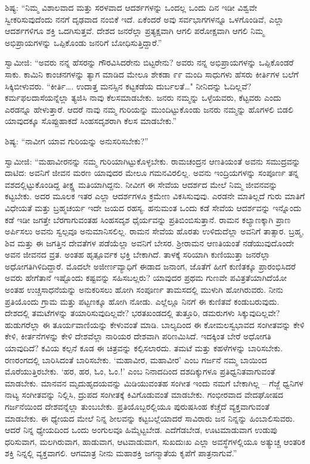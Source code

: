  ಶಿಷ್ಯ: “ನಿಮ್ಮ ವಿಶಾಲವಾದ ಮತ್ತು ಸರಳವಾದ ಆದರ್ಶಗಳನ್ನು ಒಂದಲ್ಲ ಒಂದು ದಿನ ಇಡೀ ವಿಶ್ವವೇ ಸ್ವೀಕರಿಸುವುದೆಂದು ನನಗೆ ದೃಢವಾದ ನಂಬಿಕೆ ಇದೆ. ಏಕೆಂದರೆ ಅವು ಸರ್ವಭಾಗಗಳನ್ನೂ ಒಳಗೊಂಡಿವೆ, ಎಲ್ಲಾ ಆದರ್ಶಗಳಿಗೂ ಶಕ್ತಿ ಒದಗಿಸುತ್ತವೆ. ದೇಶದ ಜನರೆಲ್ಲಾ ಪ್ರತ್ಯಕ್ಷವಾಗಿ ಆಗಲಿ ಪರೋಕ್ಷವಾಗಿ ಆಗಲಿ ನಿಮ್ಮ ಅಭಿಪ್ರಾಯಗಳನ್ನು ಒಪ್ಪಿಕೊಂಡು ಜನರಿಗೆ ಬೋಧಿಸುತ್ತಿದ್ದಾರೆ.” 

 ಸ್ವಾಮೀಜಿ: “ಅವರು ನನ್ನ ಹೆಸರನ್ನು ಗೌರವಿಸಿದರೇನು ಬಿಟ್ಟರೇನು? ಅವರು ನನ್ನ ಅಭಿಪ್ರಾಯಗಳನ್ನು ಒಪ್ಪಿಕೊಂಡರೆ ಸಾಕು. ಕಾಮಿನಿ ಕಾಂಚನಗಳನ್ನು ತ್ಯಾಗ ಮಾಡಿದ ಮೇಲೂ ಶೇಕಡಾ ೯೯ ಮಂದಿ ಸಾಧುಗಳು ಹೆಸರು ಕೀರ್ತಿಗಳ ಬಲೆಗೆ ಸಿಕ್ಕಿಬೀಳುವರು. “ಕೀರ್ತಿ…. ಉದಾತ್ತ ಮನಸ್ಸಿನ ಕಟ್ಟಕಡೆಯ ದುರ್ಬಲತೆ…" ನೀನಿದನ್ನು ಓದಿಲ್ಲವೆ? ಕರ್ಮಫಲದಾಸೆಯನ್ನೆಲ್ಲಾ ತ್ಯಜಿಸಿ ನಾವು ಕೆಲಸಮಾಡಬೇಕು. ಜನರು ನಮ್ಮನ್ನು ಒಳ್ಳೆಯವರು, ಕೆಟ್ಟವರು ಎಂದು ಎರಡನ್ನೂ ಹೇಳುತ್ತಾರೆ. ಆದರೆ ನಾವು ನಮ್ಮ ಗುರಿಯನ್ನು ಮುಂದಿಟ್ಟುಕೊಂಡು ಜನರು ನಮ್ಮನ್ನು ಹೊಗಳಲಿ ಬಿಡಲಿ ಯಾವುದಕ್ಕೂ ಸೊಪ್ಪುಹಾಕದೆ ಸಿಂಹಸದೃಶರಾಗಿ ಕೆಲಸ ಮಾಡಬೇಕು.” 

 ಶಿಷ್ಯ: “ನಾವೀಗ ಯಾವ ಗುರಿಯನ್ನು ಅನುಸರಿಸಬೇಕು?” 

 ಸ್ವಾಮೀಜಿ: “ಮಹಾವೀರನನ್ನು ನಮ್ಮ ಗುರಿಯಾಗಿಟ್ಟುಕೊಳ್ಳಬೇಕು. ರಾಮಚಂದ್ರನ ಆಣತಿಯಂತೆ ಅವನು ಸಮುದ್ರವನ್ನು ದಾಟಿದ: ಅವನಿಗೆ ಜೀವನ ಮರಣ ಯಾವುದರ ಮೇಲೂ ಗಮನವಿರಲಿಲ್ಲ. ಅವನು ಇಂದ್ರಿಯಗಳನ್ನು ಸಂಪೂರ್ಣ ತನ್ನ ವಶದಲ್ಲಿಟ್ಟುಕೊಂಡಿದ್ದ ತೀಕ್ಷ್ಣ ಮತಿಯಾಗಿದ್ದನು. ನೀವೀಗ ಈ ಸೇವೆಯ ಆದರ್ಶದ ಮೇಲೆ ನಿಮ್ಮ ಜೀವನವನ್ನು ಕಟ್ಟಬೇಕು. ಅದರ ಮೂಲಕ ಇತರ ಎಲ್ಲಾ ಆದರ್ಶಗಳೂ ಕ್ರಮೇಣ ವಿಕಸಿಸುವುವು. ಎರಡನೇ ಮಾತಿಲ್ಲದೆ ಗುರು ಮಾತಿಗೆ ವಿಧೇಯತೆ ಮತ್ತು ಬ್ರಹ್ಮಚರ್ಯ ಇದೇ ಜಯದ ರಹಸ್ಯ. ಹನುಮಂತ ಒಂದು ಕಡೆ ಸೇವೆಯ ಆದರ್ಶವನ್ನು ಇನ್ನೊಂದು ಕಡೆ ಇಡೀ ಜಗತ್ತೇ ಬೆರಗಾಗುವಂತಹ ಸಿಂಹಸದೃಶ ಧೈರ್ಯವನ್ನು ಪ್ರತಿಬಿಂಬಿಸುತ್ತಾನೆ. ರಾಮನ ಕಲ್ಯಾಣಕ್ಕಾಗಿ ಪ್ರಾಣ ಅರ್ಪಿಸಲು ಅವನು ಸ್ವಲ್ಪವೂ ಅನುಮಾನಿಸಲಿಲ್ಲ. ರಾಮನ ಸೇವೆಯ ಹೊರತು ಉಳಿದುದೆಲ್ಲಾ ಅವನಿಗೆ ತಾತ್ಸಾರ. ಬ್ರಹ್ಮ, ಶಿವ ಮತ್ತು ಈ ಜಗತ್ತಿನ ದೇವತೆಗಳ ಪಡೆಯೆಲ್ಲಾ ಅವನಿಗೆ ಬೇಸರ. ಶ‍್ರೀರಾಮನ ಆಣತಿಯಂತೆ ನಡೆಯುವುದೊಂದೇ ಅವನ ಜೀವನದ ವ್ರತ. ಅಂತಹ ಹೃತ್ಪೂರ್ವಕ ಭಕ್ತಿ ಬೇಕಾಗಿದೆ. ತಾಳಕ್ಕೆ ಸರಿಯಾಗಿ ಕುಣಿಯುತ್ತಾ ಜನರೆಲ್ಲಾ ಅಧೋಗತಿಗಿಳಿದಿದ್ದಾರೆ. ಮೊದಲೇ ಅಜೀರ್ಣವ್ಯಾಧಿಗೆ ಈಡಾದ ಜನಾಂಗ, ಜೊತೆಗೆ ಹೀಗೆ ಕುಣಿತಕ್ಕೂ‌ ಪ್ರಾರಂಭಿಸಿದರೆ ಅವರು ಹೇಗೆತಾನೆ ಇಷ್ಟೊಂದು ಕಷ್ಟವನ್ನು ಸಹಿಸಬಲ್ಲರು? ಯಾವುದರ ಪ್ರಥಮ ಗುಣವೇ ಪವಿತ್ರತೆಯಾಗಿದೆಯೋ ಅಂತಹ ಉಚ್ಚಸಾಧನೆಯನ್ನು ಅನುಕರಿಸಲು ಹೋಗಿ ಸಂಪೂರ್ಣ ತಾಮಸದಲ್ಲಿ ಮುಳುಗಿ ಹೋಗಿರುವರು. ನೀನು ಪ್ರತಿಯೊಂದು ಗ್ರಾಮ ಮತ್ತು ಪಟ್ಟಣಕ್ಕೂ ಹೋಗಿ ನೋಡು. ಎಲ್ಲೆಲ್ಲೂ ನಿನಗೆ ಈ ಕುಣಿತವೆ ಕಂಡುಬರುವುದು. ದೇಶದಲ್ಲಿ ತಮಟೆಗಳನ್ನು ತಯಾರಿಸುವುದಿಲ್ಲವೇ? ಭರತಖಂಡದಲ್ಲಿ ತುತ್ತೂರಿ, ಡಮರುಗಳು ಸಿಕ್ಕುವುದಿಲ್ಲವೇ? ಹುಡುಗರೆಲ್ಲಾ ಈ ತೂರ್ಯವಾಣಿಯನ್ನು ಕೇಳುವಂತೆ ಮಾಡಿ. ಬಾಲ್ಯದಿಂದ ಈ ಕೋಮಲಸ್ವಭಾವದ ಸಂಗೀತವನ್ನು ಕೇಳಿ ಕೇಳಿ, ಕೀರ್ತನೆಗಳನ್ನು ಕೇಳಿ ದೇಶವೆಲ್ಲಾ ನಾರಿಯರ ದೇಶವಾಗಿ ಪರಿಣಮಿಸಿದೆ. ಇದಕ್ಕಿಂತ ಬೇರೆ ಅಧೋಗತಿ ಯಾವುದಿದೆ? ಕವಿಯ ಕಲ್ಪನೆ ಕೂಡ ಈ ಚಿತ್ರವನ್ನು ಕಲ್ಪಿಸಲಾರದು. ತಮಟೆ ಮತ್ತು ಕಹಳೆಗಳನ್ನು ಬಾರಿಸಬೇಕು. ರಣರಂಗದಲ್ಲಿ ಬಾರಿಸಿದಂತೆ ಬಾರಿಸಬೇಕು. ‘ಮಹಾವೀರ, ಮಹಾವೀರ’ ಎಂಬ ಗರ್ಜನೆ ನಮ್ಮ ಬಾಯಿಂದ ಮೊರೆಯುತ್ತಿರಬೇಕು. ‘ಹರ, ಹರ, ಓಂ, ಓಂ.!’ ಎಂಬ ನಿನಾದದಿಂದ ದಶದಿಕ್ಕುಗಳೂ ಪ್ರತಿಧ್ವನಿತವಾಗುವಂತೆ ಮಾಡಬೇಕು. ಮಾನವನ ಮೃದುಹೃದಯವನ್ನು ಮಿಡಿಯುವಂತಹ ಸಂಗೀತ ಇಂದು ನಮಗೆ ಬೇಕಾಗಿಲ್ಲ – ಗೆಜ್ಜೆ ಧ್ವನಿಗಳ ನಾಟ್ಯ ಸಂಗೀತವನ್ನು ನಿಲ್ಲಿಸಿ, ದ್ರುಪದ ಸಂಗೀತಕ್ಕೆ ಕಿವಿಗೊಡುವಂತೆ ಮಾಡಬೇಕು. ಗಂಭೀರವಾದ ವೇದಘೋಷದ ಗರ್ಜನೆಯಿಂದ ದೇಶವನ್ನೆಲ್ಲಾ ತುಂಬಬೇಕು. ಪ್ರತಿಯೊಬ್ಬರಲ್ಲಿಯೂ ಪುರುಷಸಿಂಹ ಕೆಚ್ಚೆದೆ ವ್ಯಕ್ತವಾಗುವಂತೆ ಮಾಡಬೇಕು. ಈ ಧ್ಯೇಯದ ಮೇಲೆ ನಿನ್ನ ಶೀಲವನ್ನು ಕಟ್ಟಬಲ್ಲೆಯಾದರೆ ಸಾವಿರಾರು ಜನ ನಿನ್ನನ್ನು ಹಿಂಬಾಲಿಸುವರು. ಆದರೆ ನಿನ್ನ ಧ್ಯೇಯದಿಂದ ಒಂದು ಅಂಗುಲವೂ ಹಿಮ್ಮೆಟ್ಟಬೇಡ. ಎದೆಗೆಡಬೇಡ, ಊಟಮಾಡುವಾಗ ಉಡುಪು ಧರಿಸುವಾಗ, ಮಲಗಿರುವಾಗ, ಹಾಡುವಾಗ, ಆಟವಾಡುವಾಗ, ಸುಖದುಃಖ ಎಲ್ಲಾ ಅವಸ್ಥೆಗಳಲ್ಲಿಯೂ ಅತ್ಯುಚ್ಚ ಆಂತರಿಕ ಶಕ್ತಿ ನಿನ್ನಲ್ಲಿ ವ್ಯಕ್ತವಾಗಲಿ. ಆಗಮಾತ್ರ ನೀನು ಮಹಾಶಕ್ತಿ ಜಗನ್ಮಾತೆಯ ಕೃಪೆಗೆ ಪಾತ್ರನಾಗುವೆ.” 

